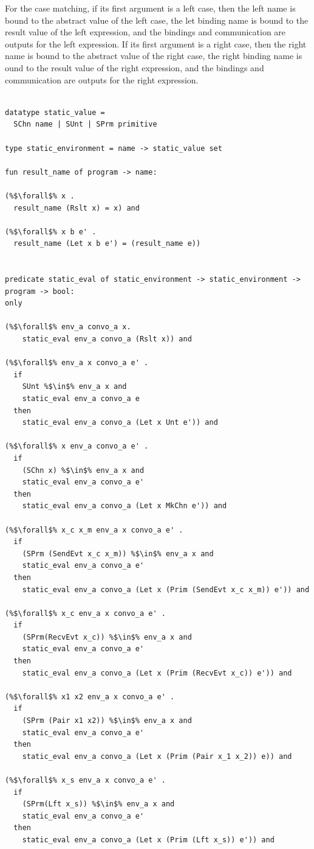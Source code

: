 \documentclass{article}
\begin{document}
For the case matching, if its first argument is a left case, then the left name is bound to the
abstract value of the left case, the let binding name is bound to the result value of the left
expression, and the bindings and communication are outputs for the left expression.  If its
first argument is a right case, then the right name is bound to the abstract value of the right
case, the right binding name is ound to the result value of the right expression, and the
bindings and communication are outputs for the right expression. 

\begin{lstlisting}[language=logic, escapechar=\%]

datatype static_value =
  SChn name | SUnt | SPrm primitive 

type static_environment = name -> static_value set

fun result_name of program -> name:

(%$\forall$% x .
  result_name (Rslt x) = x) and

(%$\forall$% x b e' . 
  result_name (Let x b e') = (result_name e))

  
predicate static_eval of static_environment -> static_environment -> program -> bool:
only

(%$\forall$% env_a convo_a x.
    static_eval env_a convo_a (Rslt x)) and

(%$\forall$% env_a x convo_a e' .
  if 
    SUnt %$\in$% env_a x and
    static_eval env_a convo_a e
  then
    static_eval env_a convo_a (Let x Unt e')) and

(%$\forall$% x env_a convo_a e' .
  if 
    (SChn x) %$\in$% env_a x and
    static_eval env_a convo_a e'
  then  
    static_eval env_a convo_a (Let x MkChn e')) and

(%$\forall$% x_c x_m env_a x convo_a e' .
  if
    (SPrm (SendEvt x_c x_m)) %$\in$% env_a x and
    static_eval env_a convo_a e' 
  then
    static_eval env_a convo_a (Let x (Prim (SendEvt x_c x_m)) e')) and

(%$\forall$% x_c env_a x convo_a e' . 
  if 
    (SPrm(RecvEvt x_c)) %$\in$% env_a x and
    static_eval env_a convo_a e'
  then
    static_eval env_a convo_a (Let x (Prim (RecvEvt x_c)) e')) and

(%$\forall$% x1 x2 env_a x convo_a e' .
  if
    (SPrm (Pair x1 x2)) %$\in$% env_a x and
    static_eval env_a convo_a e'
  then
    static_eval env_a convo_a (Let x (Prim (Pair x_1 x_2)) e)) and

(%$\forall$% x_s env_a x convo_a e' .
  if
    (SPrm(Lft x_s)) %$\in$% env_a x and
    static_eval env_a convo_a e' 
  then
    static_eval env_a convo_a (Let x (Prim (Lft x_s)) e')) and


\end{lstlisting}
\end{document}
